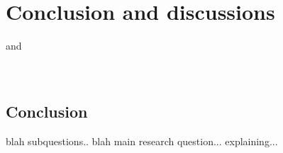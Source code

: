 \chapter{Conclusion and discussions}
\label{ch:conclusionanddiscussions}

\parencite{Dietz2008} and \parencite{Dietz2013}\\
\parencite{Digitaleoverheid2021}\\
\parencite{Knops2021}\\

\section{Conclusion}
\label{sec:conclusion}


blah subquestions.. blah main research question... explaining...


